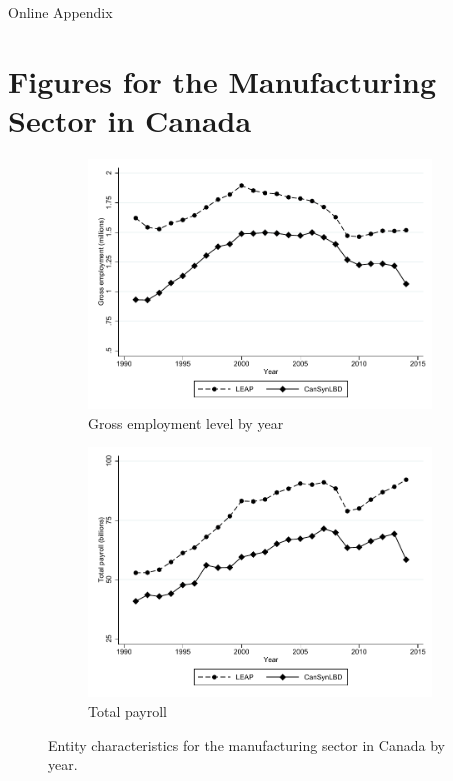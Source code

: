 
\FloatBarrier

\appendix

{\LARGE{Online Appendix}}

\section{Figures for the Manufacturing Sector in Canada}
\label{sec:appendix_figures}

\begin{figure}[H]
\centering
\begin{subfigure}[h]{0.48\linewidth}
\label{tab:Can:GrossEmploymentPrivate}
\includegraphics[width=\linewidth]{graphs/Gross_employment_level_by_year_manufacturing_bw.pdf} 
\caption{Gross employment level by year} %
\end{subfigure}
\hfill
\begin{subfigure}[h]{0.48\linewidth}
\includegraphics[width=\linewidth]{graphs/Total_payroll_by_year_manufacturing_bw.pdf}
\caption{Total payroll}
\end{subfigure}%
\caption{Entity characteristics for the manufacturing sector in Canada by year.}\label{fig:entity_chracteristics_manufac}
\end{figure}


